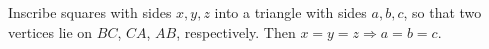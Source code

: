 Inscribe squares with sides $x, y, z$ into a triangle with sides $a, b, c$, so that two vertices lie on $BC$, $CA$, $AB$, respectively. Then $x = y = z \Rightarrow a = b = c$.
